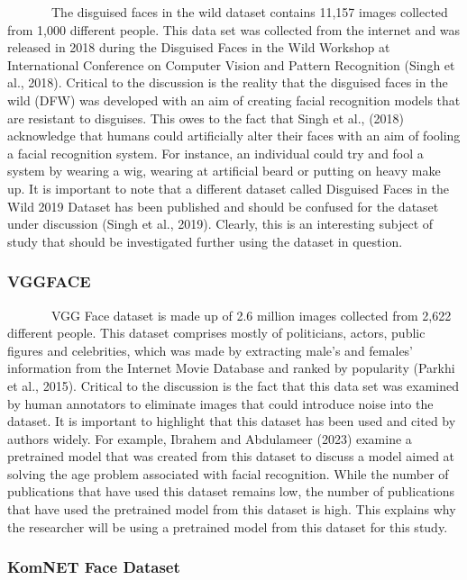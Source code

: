 \documentclass[
  12pt,
]{article}
\begin{document}
~~~~~~~The disguised faces in the wild dataset contains 11,157 images
collected from 1,000 different people. This data set was collected from
the internet and was released in 2018 during the Disguised Faces in the
Wild Workshop at International Conference on Computer Vision and Pattern
Recognition (Singh et al., 2018). Critical to the discussion is the
reality that the disguised faces in the wild (DFW) was developed with an
aim of creating facial recognition models that are resistant to
disguises. This owes to the fact that Singh et al., (2018) acknowledge
that humans could artificially alter their faces with an aim of fooling
a facial recognition system. For instance, an individual could try and
fool a system by wearing a wig, wearing at artificial beard or putting
on heavy make up. It is important to note that a different dataset
called Disguised Faces in the Wild 2019 Dataset has been published and
should be confused for the dataset under discussion (Singh et al.,
2019). Clearly, this is an interesting subject of study that should be
investigated further using the dataset in question.

\subsubsection{VGGFACE}\label{vggface}

~~~~~~~VGG Face dataset is made up of 2.6 million images collected from
2,622 different people. This dataset comprises mostly of politicians,
actors, public figures and celebrities, which was made by extracting
male's and females' information from the Internet Movie Database and
ranked by popularity (Parkhi et al., 2015). Critical to the discussion
is the fact that this data set was examined by human annotators to
eliminate images that could introduce noise into the dataset. It is
important to highlight that this dataset has been used and cited by
authors widely. For example, Ibrahem and Abdulameer (2023) examine a
pretrained model that was created from this dataset to discuss a model
aimed at solving the age problem associated with facial recognition.
While the number of publications that have used this dataset remains
low, the number of publications that have used the pretrained model from
this dataset is high. This explains why the researcher will be using a
pretrained model from this dataset for this study.

\subsubsection{KomNET Face Dataset}\label{komnet-face-dataset}
\end{document}
